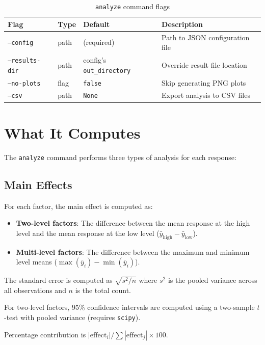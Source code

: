 \documentclass[11pt]{book}
\begin{document}
\begin{table}[H]
\centering
\caption{\texttt{analyze} command flags}
\begin{tabular}{@{}lllp{4.5cm}@{}}
\toprule
\textbf{Flag} & \textbf{Type} & \textbf{Default} & \textbf{Description} \\
\midrule
\texttt{--config} & path & (required) & Path to JSON configuration file \\
\texttt{--results-dir} & path & config's \texttt{out\_directory} & Override result file location \\
\texttt{--no-plots} & flag & \texttt{false} & Skip generating PNG plots \\
\texttt{--csv} & path & \texttt{None} & Export analysis to CSV files \\
\bottomrule
\end{tabular}
\end{table}

\section{What It Computes}

The \texttt{analyze} command performs three types of analysis for each response:

\subsection{Main Effects}

For each factor, the main effect is computed as:
\begin{itemize}
  \item \textbf{Two-level factors}: The difference between the mean response at the high level and the mean response at the low level ($\bar{y}_{\text{high}} - \bar{y}_{\text{low}}$).
  \item \textbf{Multi-level factors}: The difference between the maximum and minimum level means ($\max(\bar{y}_i) - \min(\bar{y}_i)$).
\end{itemize}

The standard error is computed as $\sqrt{s^2 / n}$ where $s^2$ is the pooled variance across all observations and $n$ is the total count.

For two-level factors, 95\% confidence intervals are computed using a two-sample $t$-test with pooled variance (requires \texttt{scipy}).

Percentage contribution is $|\text{effect}_i| / \sum |\text{effect}_j| \times 100$.
\end{document}
